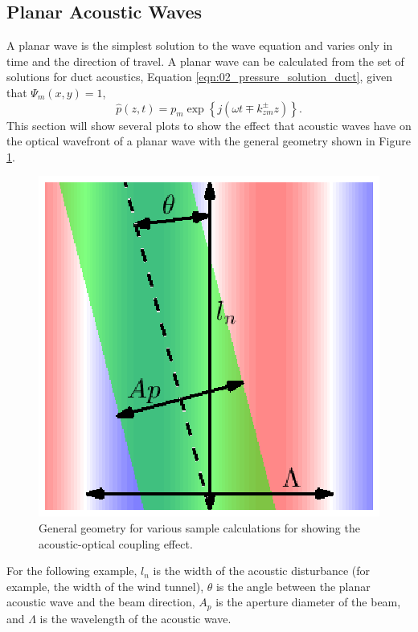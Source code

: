 \subsection{Planar Acoustic Waves}
A planar wave is the simplest solution to the wave equation and varies only in time and the direction of travel.
A planar wave can be calculated from the set of solutions for duct acoustics, Equation \ref{eqn:02_pressure_solution_duct}, given that $\Psi_m(x,y)=1$,
\begin{equation}
  \hat{p}(z,t) = p_m\exp\left\{j(\omega t \mp k_{zm}^\pm z)\right\} \textrm{.}
  \label{eqn:03_plane_wave}
\end{equation}
This section will show several plots to show the effect that acoustic waves have on the optical wavefront of a planar wave with the general geometry shown in Figure \ref{fig:03_planar_sample_domain}.
\begin{figure}
  \centering
  \includegraphics{../matlab/03_aero_optics_acoustics/planar_sample_domain.eps}
  \caption{General geometry for various sample calculations for showing the acoustic-optical coupling effect.}
  \label{fig:03_planar_sample_domain}
\end{figure}
For the following example, $l_n$ is the width of the acoustic disturbance (for example, the width of the wind tunnel), $\theta$ is the angle between the planar acoustic wave and the beam direction, $A_p$ is the aperture diameter of the beam, and $\Lambda$ is the wavelength of the acoustic wave.


